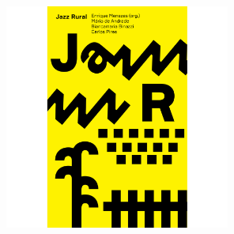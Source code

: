 %
%
%
%
%
%
%
%
%

\pagebreak



\begin{center}
\hspace*{.5cm}\includegraphics[width=74mm]{./grid/jazz.jpg}
\end{center}

